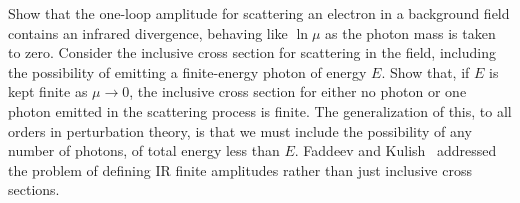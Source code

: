 \begin{banksproblems}
Show that the one-loop amplitude for scattering an electron in a background field
contains an infrared divergence, behaving like $\ln\mu$ as the photon mass is taken
to zero. Consider the inclusive cross section for scattering in the field, including the
possibility of emitting a finite-energy photon of energy $E$. Show that, if $E$ is kept
finite as $\mu\to0$, the inclusive cross section for either no photon or one photon
emitted in the scattering process is finite. The generalization of this, to all orders
in perturbation theory, is that we must include the possibility of any number
of photons, of total energy less than $E$. Faddeev and Kulish~\cite{banks-ref-35}
addressed the problem of defining IR finite amplitudes rather than just inclusive cross sections.

\end{banksproblems}
